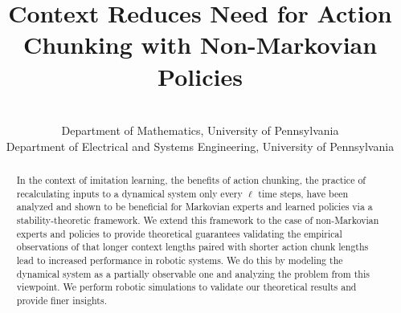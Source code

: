 \documentclass{l4dc2026}
\title[Context for Less Chunking]{Context Reduces Need for Action Chunking with Non-Markovian Policies}
\author{%
 \Name{Nihar Ballamudi} \Email{niharb@sas.upenn.edu}\\
 \addr Department of Mathematics, University of Pennsylvania
 \AND
 \Name{Kyle Horton} \Email{kyhorton@engineering.upenn.edu}\\
 \addr Department of Electrical and Systems Engineering, University of Pennsylvania%
}
\begin{document}
\maketitle
\begin{abstract}
In the context of imitation learning, the benefits of action chunking, the practice of recalculating inputs to a dynamical system only every $\ell$ time steps, have been analyzed and shown to be beneficial for Markovian experts and learned policies via a stability-theoretic framework. We extend this framework to the case of non-Markovian experts and policies to provide theoretical guarantees validating the empirical observations of \cite{zeng2026revisitingopenloopexecutionrobotics} that longer context lengths paired with shorter action chunk lengths lead to increased performance in robotic systems. We do this by modeling the dynamical system as a partially observable one and analyzing the problem from this viewpoint. We perform robotic simulations to validate our theoretical results and provide finer insights.
\end{abstract}
\end{document}
